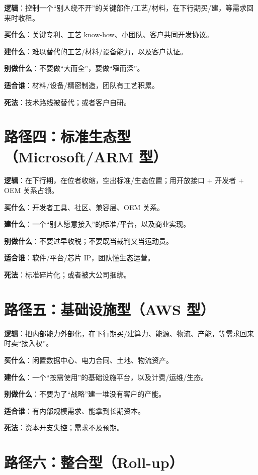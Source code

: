 \textbf{逻辑}：控制一个``别人绕不开''的关键部件/工艺/材料，在下行期买/建，等需求回来时收租。

\textbf{买什么}：关键专利、工艺 know-how、小团队、客户共同开发协议。

\textbf{建什么}：难以替代的工艺/材料/设备能力，以及客户认证。

\textbf{别做什么}：不要做``大而全''，要做``窄而深''。

\textbf{适合谁}：材料/设备/精密制造，团队有工艺积累。

\textbf{死法}：技术路线被替代；或者客户自研。

\section{路径四：标准生态型（Microsoft/ARM
型）}\label{ux8defux5f84ux56dbux6807ux51c6ux751fux6001ux578bmicrosoftarm-ux578b}

\textbf{逻辑}：在下行期，在位者收缩，空出标准/生态位置；用开放接口 +
开发者 + OEM 关系占领。

\textbf{买什么}：开发者工具、社区、兼容层、OEM 关系。

\textbf{建什么}：一个``别人愿意接入''的标准/平台，以及商业实现。

\textbf{别做什么}：不要过早收税；不要既当裁判又当运动员。

\textbf{适合谁}：软件/平台/芯片 IP，团队懂生态运营。

\textbf{死法}：标准碎片化；或者被大公司捆绑。

\section{路径五：基础设施型（AWS
型）}\label{ux8defux5f84ux4e94ux57faux7840ux8bbeux65bdux578baws-ux578b}

\textbf{逻辑}：把内部能力外部化，在下行期买/建算力、能源、物流、产能，等需求回来时卖``接入权''。

\textbf{买什么}：闲置数据中心、电力合同、土地、物流资产。

\textbf{建什么}：一个``按需使用''的基础设施平台，以及计费/运维/生态。

\textbf{别做什么}：不要为了``战略''建一堆没有客户的产能。

\textbf{适合谁}：有内部规模需求、能拿到长期资本。

\textbf{死法}：资本开支失控；需求不及预期。

\section{路径六：整合型（Roll-up）}\label{ux8defux5f84ux516dux6574ux5408ux578broll-up}


